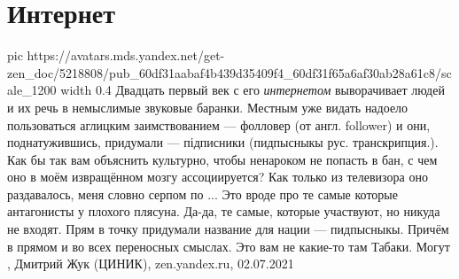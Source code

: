  
 
 
 
 
\chapter{Интернет}

\ifcmt
  pic https://avatars.mds.yandex.net/get-zen_doc/5218808/pub_60df31aabaf4b439d35409f4_60df31f65a6af30ab28a61c8/scale_1200
	width 0.4
\fi
Двадцать первый век с его \emph{интернетом} выворачивает людей и их речь в немыслимые
звуковые баранки. Местным уже видать надоело пользоваться аглицким
заимствованием — фолловер (от англ. follower) и они, поднатужившись, придумали
— підписники (пидпысныкы рус. транскрипция.). Как бы так вам объяснить
культурно, чтобы ненароком не попасть в бан, с чем оно в моём извращённом мозгу
ассоциируется? Как только из телевизора оно раздавалось, меня словно серпом по
... Это вроде про те самые которые антагонисты у плохого плясуна. Да-да, те
самые, которые участвуют, но никуда не входят. Прям в точку придумали название
для нации — пидпысныкы. Причём в прямом и во всех переносных смыслах. Это вам
не какие-то там Табаки. Могут
, Дмитрий Жук (ЦИНИК), zen.yandex.ru, 02.07.2021

